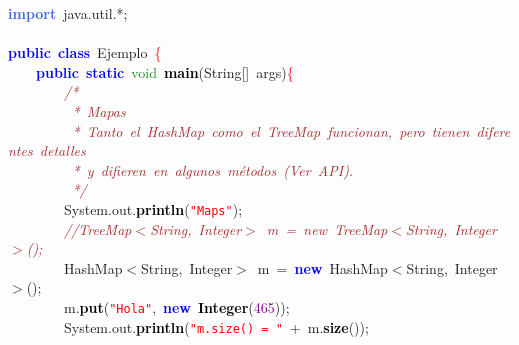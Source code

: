 
{\ttfamily \raggedright {
\noindent
\mbox{}\textbf{\textcolor{RoyalBlue}{import}}\ java\textcolor{BrickRed}{.}util\textcolor{BrickRed}{.*;} \\
\mbox{} \\
\mbox{}\textbf{\textcolor{Blue}{public}}\ \textbf{\textcolor{Blue}{class}}\ Ejemplo\ \textcolor{Red}{\{} \\
\mbox{}\ \ \ \ \textbf{\textcolor{Blue}{public}}\ \textbf{\textcolor{Blue}{static}}\ \textcolor{ForestGreen}{void}\ \textbf{\textcolor{Black}{main}}\textcolor{BrickRed}{(}String\textcolor{BrickRed}{[]}\ args\textcolor{BrickRed}{)}\textcolor{Red}{\{} \\
\mbox{}\ \ \ \ \ \ \ \ \textit{\textcolor{Brown}{/*}} \\
\mbox{}\textit{\textcolor{Brown}{\ \ \ \ \ \ \ \ \ *\ Mapas}} \\
\mbox{}\textit{\textcolor{Brown}{\ \ \ \ \ \ \ \ \ *\ Tanto\ el\ HashMap\ como\ el\ TreeMap\ funcionan,\ pero\ tienen\ diferentes\ detalles}} \\
\mbox{}\textit{\textcolor{Brown}{\ \ \ \ \ \ \ \ \ *\ y\ difieren\ en\ algunos\ métodos\ (Ver\ API).}} \\
\mbox{}\textit{\textcolor{Brown}{\ \ \ \ \ \ \ \ \ */}} \\
\mbox{}\ \ \ \ \ \ \ \ System\textcolor{BrickRed}{.}out\textcolor{BrickRed}{.}\textbf{\textcolor{Black}{println}}\textcolor{BrickRed}{(}\texttt{\textcolor{Red}{"{}Maps"{}}}\textcolor{BrickRed}{);} \\
\mbox{}\ \ \ \ \ \ \ \ \textit{\textcolor{Brown}{//TreeMap$<$String,\ Integer$>$\ m\ =\ new\ TreeMap$<$String,\ Integer$>$();}} \\
\mbox{}\ \ \ \ \ \ \ \ HashMap\textcolor{BrickRed}{$<$}String\textcolor{BrickRed}{,}\ Integer\textcolor{BrickRed}{$>$}\ m\ \textcolor{BrickRed}{=}\ \textbf{\textcolor{Blue}{new}}\ HashMap\textcolor{BrickRed}{$<$}String\textcolor{BrickRed}{,}\ Integer\textcolor{BrickRed}{$>$();} \\
\mbox{}\ \ \ \ \ \ \ \ m\textcolor{BrickRed}{.}\textbf{\textcolor{Black}{put}}\textcolor{BrickRed}{(}\texttt{\textcolor{Red}{"{}Hola"{}}}\textcolor{BrickRed}{,}\ \textbf{\textcolor{Blue}{new}}\ \textbf{\textcolor{Black}{Integer}}\textcolor{BrickRed}{(}\textcolor{Purple}{465}\textcolor{BrickRed}{));} \\
\mbox{}\ \ \ \ \ \ \ \ System\textcolor{BrickRed}{.}out\textcolor{BrickRed}{.}\textbf{\textcolor{Black}{println}}\textcolor{BrickRed}{(}\texttt{\textcolor{Red}{"{}m.size()\ =\ "{}}}\ \textcolor{BrickRed}{+}\ m\textcolor{BrickRed}{.}\textbf{\textcolor{Black}{size}}\textcolor{BrickRed}{());} \\
}}
